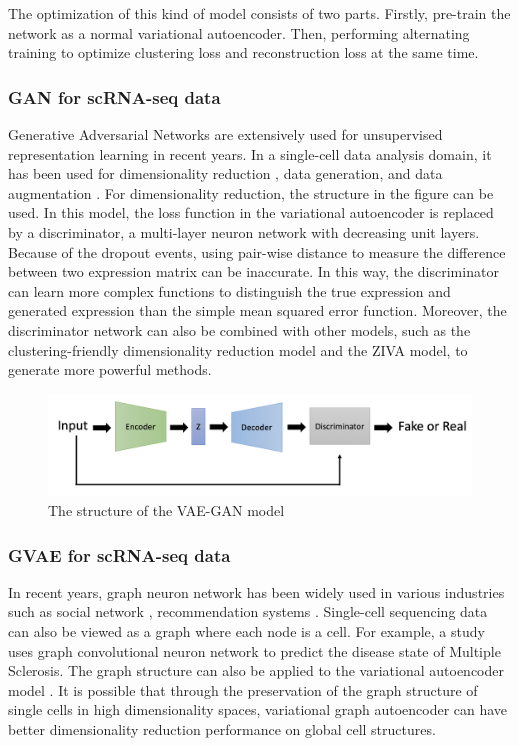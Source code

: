 The optimization of this kind of model consists of two parts. Firstly, pre-train the network as a normal variational autoencoder. Then, performing alternating training to optimize clustering loss and reconstruction loss at the same time.

\subsubsection{GAN for scRNA-seq data}
Generative Adversarial Networks \cite{radford2015unsupervised} are extensively used for unsupervised representation learning in recent years. In a single-cell data analysis domain, it has been used for dimensionality reduction \cite{lin2020deep}, data generation, and data augmentation \cite{marouf2018realistic}. For dimensionality reduction, the structure in the figure can be used. In this model, the loss function in the variational autoencoder is replaced by a discriminator, a multi-layer neuron network with decreasing unit layers. Because of the dropout events, using pair-wise distance to measure the difference between two expression matrix can be inaccurate. In this way, the discriminator can learn more complex functions to distinguish the true expression and generated expression than the simple mean squared error function. Moreover, the discriminator network can also be combined with other models, such as the clustering-friendly dimensionality reduction model and the ZIVA model, to generate more powerful methods. 

\begin{figure}[htb!]
    \centering
    \includegraphics[width=1\textwidth]{figures/myfigures/vaegan.png}
    \caption{The structure of the VAE-GAN model}
    \label{dcstru}
\end{figure}

\subsubsection{GVAE for scRNA-seq data}
In recent years, graph neuron network has been widely used in various industries such as social network \cite{yang2016revisiting}, recommendation systems \cite{kipf2016semi}. Single-cell sequencing data can also be viewed as a graph where each node is a cell. For example, a study \cite{ravindra2020disease} uses graph convolutional neuron network \cite{velivckovic2017graph} to predict the disease state of Multiple Sclerosis. The graph structure can also be applied to the variational autoencoder model \cite{kipf2016variational}. It is possible that through the preservation of the graph structure of single cells in high dimensionality spaces, variational graph autoencoder can have better dimensionality reduction performance on global cell structures.

   
